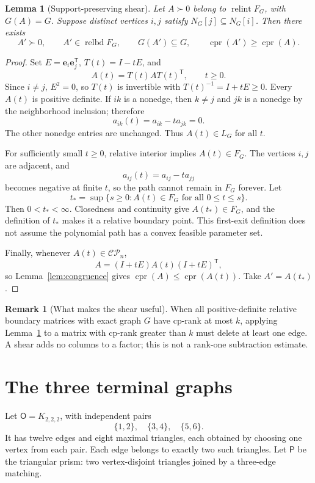 \documentclass[11pt,a4paper]{article}
\newtheorem{lemma}[theorem]{Lemma}
\theoremstyle{definition}
\newtheorem{remark}[theorem]{Remark}
\newcommand{\CP}{\mathcal{CP}}
\newcommand{\OO}{\mathsf{O}}
\newcommand{\PP}{\mathsf{P}}
\DeclareMathOperator{\cpr}{cpr}
\DeclareMathOperator{\relint}{relint}
\DeclareMathOperator{\relbd}{relbd}
\newcommand{\ee}{\mathbf e}
\newcommand{\T}{\mathsf T}
\begin{document}
\begin{lemma}[Support-preserving shear]\label{lem:shear}
Let $A\succ0$ belong to $\relint F_G$, with $G(A)=G$. Suppose distinct vertices $i,j$ satisfy $N_G[j]\subseteq N_G[i]$. Then there exists
\[
 A'\succ0,\qquad A'\in\relbd F_G,\qquad
 G(A')\subseteq G,\qquad \cpr(A')\geq\cpr(A).
\]
\end{lemma}
\begin{proof}
Set $E=\ee_i\ee_j^{\T}$, $T(t)=I-tE$, and
\begin{equation}\label{eq:shear}
 A(t)=T(t)AT(t)^{\T},\qquad t\geq0.
\end{equation}
Since $i\ne j$, $E^2=0$, so $T(t)$ is invertible with $T(t)^{-1}=I+tE\geq0$. Every $A(t)$ is positive definite. If $ik$ is a nonedge, then $k\ne j$ and $jk$ is a nonedge by the neighborhood inclusion; therefore
\[
 a_{ik}(t)=a_{ik}-t a_{jk}=0.
\]
The other nonedge entries are unchanged. Thus $A(t)\in L_G$ for all $t$.

For sufficiently small $t\geq0$, relative interior implies $A(t)\in F_G$. The vertices $i,j$ are adjacent, and
\[
 a_{ij}(t)=a_{ij}-t a_{jj}
\]
becomes negative at finite $t$, so the path cannot remain in $F_G$ forever. Let
\[
 t_* =\sup\{s\geq0:A(t)\in F_G\text{ for all }0\leq t\leq s\}.
\]
Then $0<t_*<\infty$. Closedness and continuity give $A(t_*)\in F_G$, and the definition of $t_*$ makes it a relative boundary point. This first-exit definition does not assume the polynomial path has a convex feasible parameter set.

Finally, whenever $A(t)\in\CP_n$,
\[
 A=(I+tE)A(t)(I+tE)^{\T},
\]
so Lemma~\ref{lem:congruence} gives $\cpr(A)\leq\cpr(A(t))$. Take $A'=A(t_*)$.
\end{proof}

\begin{remark}[What makes the shear useful]\label{rem:shearuse}
When all positive-definite relative boundary matrices with exact graph $G$ have cp-rank at most $k$, applying Lemma~\ref{lem:shear} to a matrix with cp-rank greater than $k$ must delete at least one edge. A shear adds no columns to a factor; this is not a rank-one subtraction estimate.
\end{remark}

\section{The three terminal graphs}

Let $\OO=K_{2,2,2}$, with independent pairs
\begin{equation}\label{eq:pairs}
 \{1,2\},\quad\{3,4\},\quad\{5,6\}.
\end{equation}
It has twelve edges and eight maximal triangles, each obtained by choosing one vertex from each pair. Each edge belongs to exactly two such triangles. Let $\PP$ be the triangular prism: two vertex-disjoint triangles joined by a three-edge matching.
\end{document}
